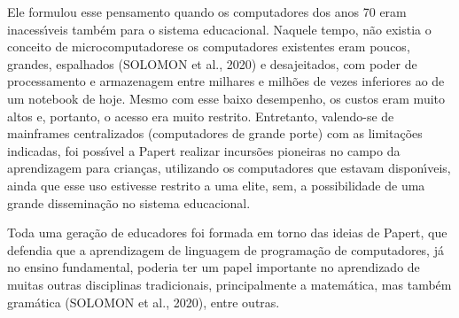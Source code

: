 \documentclass[
12pt,		%
openright,	%
twoside,  %
a4paper,			%
chapter=TITLE,		%
english,			%
french,				%
spanish,			%
brazil				%
]{USPSC-classe/USPSC}
\begin{document}
\noindent\begin{center}\mbox{\centering{}}\end{center}


Ele formulou esse pensamento quando os computadores dos anos 70 eram inacess\'{\i}veis tamb\'em para o sistema educacional. Naquele tempo, n\~ao existia o conceito de \textquotedbl microcomputadores\textquotedbl  e os computadores existentes eram poucos, grandes, espalhados  (SOLOMON et al., 2020) e desajeitados, com poder de processamento e armazenagem entre milhares e milh\~oes de vezes inferiores ao de um notebook de hoje. Mesmo com esse baixo desempenho, os custos eram muito altos e, portanto, o acesso era muito restrito. Entretanto, valendo-se de mainframes centralizados (computadores de grande porte) com as limita\c{c}\~oes indicadas, foi poss\'{\i}vel a Papert realizar incurs\~oes pioneiras no campo da aprendizagem para crian\c{c}as, utilizando os computadores que estavam dispon\'{\i}veis, ainda que esse uso estivesse restrito a uma elite, sem, a possibilidade de uma grande dissemina\c{c}\~ao no sistema educacional.

















Toda uma gera\c{c}\~ao de educadores foi formada em torno das ideias de Papert, que defendia que a aprendizagem de linguagem de programa\c{c}\~ao de computadores, j\'a no ensino fundamental, poderia ter um papel importante no aprendizado de muitas outras disciplinas tradicionais, principalmente a matem\'atica, mas tamb\'em gram\'atica (SOLOMON et al., 2020), entre outras.
\end{document}
